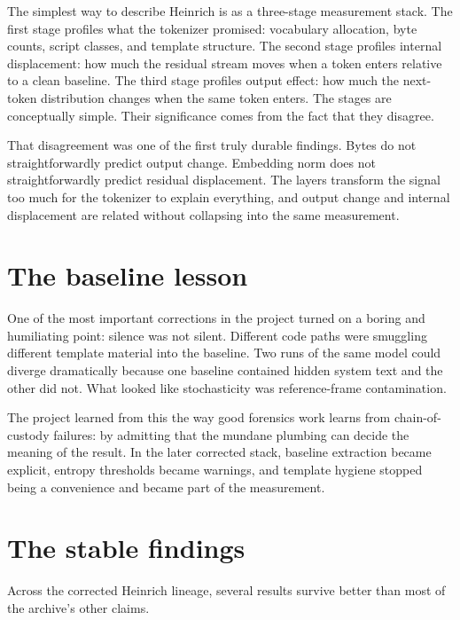 \documentclass[11pt,oneside]{book}
\begin{document}
The simplest way to describe Heinrich is as a three-stage measurement stack. The first stage profiles what the tokenizer promised: vocabulary allocation, byte counts, script classes, and template structure. The second stage profiles internal displacement: how much the residual stream moves when a token enters relative to a clean baseline. The third stage profiles output effect: how much the next-token distribution changes when the same token enters. The stages are conceptually simple. Their significance comes from the fact that they disagree.

That disagreement was one of the first truly durable findings. Bytes do not straightforwardly predict output change. Embedding norm does not straightforwardly predict residual displacement. The layers transform the signal too much for the tokenizer to explain everything, and output change and internal displacement are related without collapsing into the same measurement.

\section{The baseline lesson}
One of the most important corrections in the project turned on a boring and humiliating point: silence was not silent. Different code paths were smuggling different template material into the baseline. Two runs of the same model could diverge dramatically because one baseline contained hidden system text and the other did not. What looked like stochasticity was reference-frame contamination.

The project learned from this the way good forensics work learns from chain-of-custody failures: by admitting that the mundane plumbing can decide the meaning of the result. In the later corrected stack, baseline extraction became explicit, entropy thresholds became warnings, and template hygiene stopped being a convenience and became part of the measurement.

\section{The stable findings}
Across the corrected Heinrich lineage, several results survive better than most of the archive's other claims.
\end{document}
